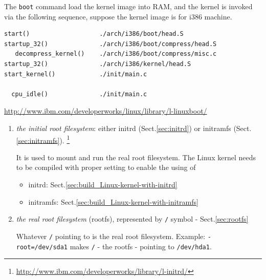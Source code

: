 The \verb!boot! command load the kernel image into RAM, and the
kernel is invoked via the following sequence, suppose the kernel image
is for i386 machine.
\begin{verbatim}
start()                   ./arch/i386/boot/head.S
startup_32()              ./arch/i386/boot/compress/head.S
   decompress_kernel()    ./arch/i386/boot/compress/misc.c
startup_32()              ./arch/i386/kernel/head.S
start_kernel()            ./init/main.c

  cpu_idle()              ./init/main.c   
\end{verbatim}
\url{http://www.ibm.com/developerworks/linux/library/l-linuxboot/}
\begin{enumerate}
  \item {\it the initial root filesystem}: either initrd (Sect.\ref{sec:initrd})
  or initramfs (Sect.\ref{sec:initramfs}).
  \footnote{\url{http://www.ibm.com/developerworks/library/l-initrd/}}
  
  It is used to mount and run the real root filesystem.  The Linux kernel
  needs to be compiled with proper setting to enable the using of 
  \begin{itemize}
    \item initrd: Sect.\ref{sec:build_Linux-kernel-with-initrd}
    \item initramfs: Sect.\ref{sec:build_Linux-kernel-with-initramfs}
  \end{itemize}
     
  \item {\it the real root filesystem} (rootfs), represented by \verb!/! symbol
  - Sect.\ref{sec:rootfs}
  
Whatever \verb!/! pointing to is the real root filesystem. Example:
\verb!-root=/dev/sda1! makes \verb!/! - the rootfs - pointing to
\verb!/dev/hda1!.
\end{enumerate}

